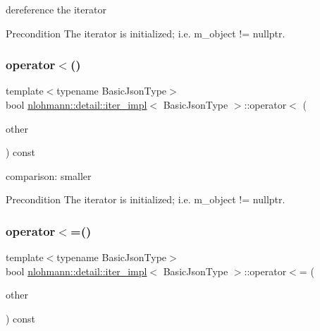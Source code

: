 dereference the iterator 

\begin{DoxyPrecond}{Precondition}
The iterator is initialized; i.\+e. {\ttfamily m\+\_\+object != nullptr}. 
\end{DoxyPrecond}
\mbox{\label{classnlohmann_1_1detail_1_1iter__impl_a0d14cd76203e00bdcef6a64a5d055cc7}} 
\subsubsection{\texorpdfstring{operator$<$()}{operator<()}}
{\footnotesize\ttfamily template$<$typename Basic\+Json\+Type$>$ \\
bool \mbox{\hyperlink{classnlohmann_1_1detail_1_1iter__impl}{nlohmann\+::detail\+::iter\+\_\+impl}}$<$ Basic\+Json\+Type $>$\+::operator$<$ (\begin{DoxyParamCaption}\item[{const \mbox{\hyperlink{classnlohmann_1_1detail_1_1iter__impl}{iter\+\_\+impl}}$<$ Basic\+Json\+Type $>$ \&}]{other }\end{DoxyParamCaption}) const\hspace{0.3cm}{\ttfamily [inline]}}



comparison\+: smaller 

\begin{DoxyPrecond}{Precondition}
The iterator is initialized; i.\+e. {\ttfamily m\+\_\+object != nullptr}. 
\end{DoxyPrecond}
\mbox{\label{classnlohmann_1_1detail_1_1iter__impl_ac6f71b36d7c87e427d1fee83f2600fad}} 
\subsubsection{\texorpdfstring{operator$<$=()}{operator<=()}}
{\footnotesize\ttfamily template$<$typename Basic\+Json\+Type$>$ \\
bool \mbox{\hyperlink{classnlohmann_1_1detail_1_1iter__impl}{nlohmann\+::detail\+::iter\+\_\+impl}}$<$ Basic\+Json\+Type $>$\+::operator$<$= (\begin{DoxyParamCaption}\item[{const \mbox{\hyperlink{classnlohmann_1_1detail_1_1iter__impl}{iter\+\_\+impl}}$<$ Basic\+Json\+Type $>$ \&}]{other }\end{DoxyParamCaption}) const\hspace{0.3cm}{\ttfamily [inline]}}




